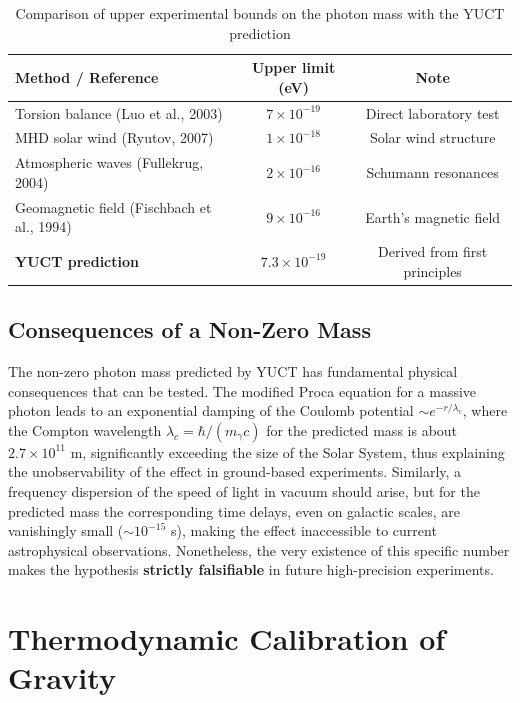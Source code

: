 \documentclass[11pt,a4paper]{article}
\begin{document}
	\begin{table}[h!]
		\centering
		\caption{Comparison of upper experimental bounds on the photon mass with the YUCT prediction}
		\label{tab:photon_limits}
		\small
		\begin{tabular}{lcc}
			\toprule
			\textbf{Method / Reference} & \textbf{Upper limit (eV)} & \textbf{Note} \\
			\midrule
			Torsion balance (Luo et al., 2003) & $7\times10^{-19}$ & Direct laboratory test \\
			MHD solar wind (Ryutov, 2007) & $1\times10^{-18}$ & Solar wind structure \\
			Atmospheric waves (Fullekrug, 2004) & $2\times10^{-16}$ & Schumann resonances \\
			Geomagnetic field (Fischbach et al., 1994) & $9\times10^{-16}$ & Earth's magnetic field \\
			\midrule
			\textbf{YUCT prediction} & \textbf{$7.3\times10^{-19}$} & Derived from first principles \\
			\bottomrule
		\end{tabular}
	\end{table}
	
	\subsection{Consequences of a Non-Zero Mass}
	The non-zero photon mass predicted by YUCT has fundamental physical consequences that can be tested. The modified Proca equation for a massive photon \cite{Proca1936} leads to an exponential damping of the Coulomb potential $\sim e^{-r/\lambda_c}$, where the Compton wavelength $\lambda_c = \hbar / (m_\gamma c)$ for the predicted mass is about $2.7 \times 10^{11}$ m, significantly exceeding the size of the Solar System, thus explaining the unobservability of the effect in ground-based experiments. Similarly, a frequency dispersion of the speed of light in vacuum should arise, but for the predicted mass the corresponding time delays, even on galactic scales, are vanishingly small ($\sim 10^{-15}$ s), making the effect inaccessible to current astrophysical observations. Nonetheless, the very existence of this specific number makes the hypothesis \textbf{strictly falsifiable} in future high-precision experiments.
	
	\section{Thermodynamic Calibration of Gravity}
	\label{sec:thermal_gravity}
	
\end{document}
